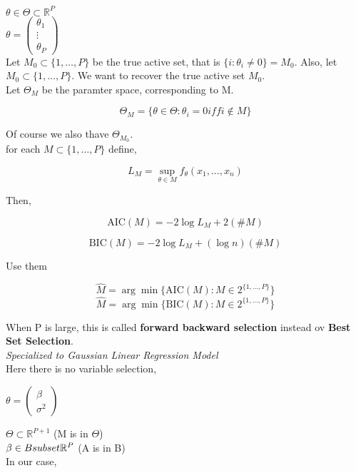 \documentclass[11pt,fleqn]{book} %
\begin{document}
$\theta \in \Theta \subset \mathbb{R}^P$\\

$\theta = \begin{pmatrix}
	\theta_1\\
	\vdots\\
	\theta_P
\end{pmatrix}$\\

Let $M_0 \subset \{1, \dots, P \}$ be the true active set, that is $\{i: \theta_i \neq 0 \} = M_0$. Also, let $M_0 \subset \{1, \dots, P\}$. We want to recover the true active set $M_0$.\\

Let $\Theta_M$ be the paramter space, corresponding to M. 

$$\Theta_M = \{\theta \in \Theta: \theta_i = 0 iff i \notin M \}$$

Of course we also thave $\Theta_{M_0}$.\\

for each $M \subset \{1, \dots, P \}$ define,

$$L_M = \sup_{\theta \in M} f_\theta (x_1, \dots, x_n) $$

Then, 

$$\text{AIC}(M) = -2 \log L_M + 2(\#M) $$

$$\text{BIC}(M) = -2 \log L_M + (\log n)(\#M) $$

Use them 

$$\hat{M} = \arg\min \{\text{AIC}(M): M \in 2^{\{1, \dots, P\}}\}$$
$$\hat{M} = \arg\min \{\text{BIC}(M): M \in 2^{\{1, \dots, P\}}\}$$

When P is large, this is called \textbf{forward backward selection} instead ov \textbf{Best Set Selection}.\\

\textit{Specialized to Gaussian Linear Regression Model}\\

Here there is no variable selection, 

$\theta = \begin{pmatrix}
	\beta\\
	\sigma^2
\end{pmatrix}$

$\Theta \subset \mathbb{R}^{P+1}$ (M is in $\Theta$)\\
$\beta \in B \\subset \mathbb{R}^P$ (A is in B)\\

In our case, 
\end{document}
